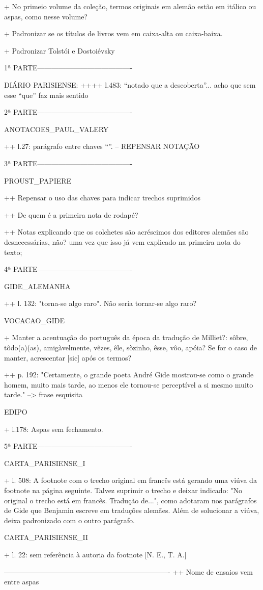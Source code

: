 + No primeio volume da coleção, termos originais em alemão estão em itálico ou aspas, como nesse volume?

+ Padronizar se os títulos de livros vem em caixa-alta ou caixa-baixa.

+ Padronizar Tolstói e Dostoiévsky

1ª PARTE----------------------------------------

DIÁRIO PARISIENSE:
++++ l.483: ``notado que a descoberta''... acho que sem esse ``que'' faz mais sentido


2ª PARTE----------------------------------------


ANOTACOES_PAUL_VALERY

++ l.27: parágrafo entre chaves ``{}''. -- REPENSAR NOTAÇÃO

3ª PARTE----------------------------------------


PROUST_PAPIERE

++ Repensar o uso das chaves para indicar trechos suprimidos

++ De quem é a primeira nota de rodapé?

++ Notas explicando que os colchetes são acréscimos dos editores alemães são desnecessárias, não? uma vez que isso já vem explicado na primeira nota do texto;

4ª PARTE----------------------------------------

GIDE_ALEMANHA

++ l. 132: "torna-se algo raro". Não seria tornar-se algo raro?


VOCACAO_GIDE

+ Manter a acentuação do português da época da tradução de Milliet?: sôbre, tôdo(a)(as), amigàvelmente, vêzes, êle, sòzinho, êsse, vôo, apóia? Se for o caso de manter, acrescentar [sic] após os termos?

++ p. 192: "Certamente, o grande poeta André Gide mostrou-se como o
grande homem, muito mais tarde, ao menos ele tornou-se
perceptível a si mesmo muito tarde." --> frase esquisita

EDIPO

+ l.178: Aspas sem fechamento.


5ª PARTE----------------------------------------

CARTA_PARISIENSE_I

+ l. 508: A footnote com o trecho original em francês está gerando uma viúva da footnote na página seguinte. Talvez suprimir o trecho e deixar indicado: "No original o trecho está em francês. Tradução de...", como adotaram nos parágrafos de Gide que Benjamin escreve em traduções alemães. Além de solucionar a viúva, deixa padronizado com o outro parágrafo.


CARTA_PARISIENSE_II

+ l. 22: sem referência à autoria da footnote [N. E., T. A.]



----------------------------------------------------------------------
++ Nome de ensaios vem entre aspas
